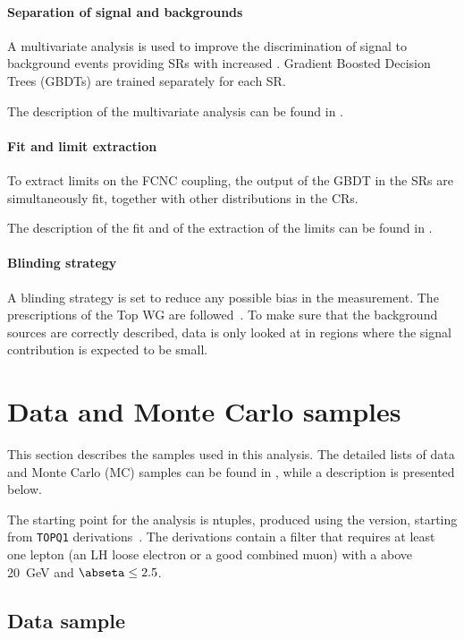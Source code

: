 \paragraph{Separation of signal and backgrounds}
A multivariate analysis is used to improve the discrimination of
signal to background events providing SRs with increased \ssb. 
Gradient Boosted Decision Trees (GBDTs) are trained separately for each SR. 

\noindent The description of the multivariate analysis can be found in
. 

\paragraph{Fit and limit extraction}
To extract limits on the FCNC \tZc coupling, the output of the
GBDT in the SRs are simultaneously fit, together with other 
distributions in the CRs. 

\noindent The description of the fit and of the extraction of the limits can be
found in .

\paragraph{Blinding strategy}
A blinding strategy is set to reduce any possible bias in the measurement. 
The prescriptions of the Top WG are followed~\cite{top:blind}.
To make sure that the background sources are correctly described,
data is only looked at in regions where the signal contribution is expected to be small. 

\section{Data and Monte Carlo samples}
\label{sec:samples}
This section describes the samples used in this analysis.
The detailed lists of data and Monte Carlo (MC) samples can be found
in \App{\ref{sec:app_mc}}, 
while a description is presented below.

The starting point for the analysis is ntuples, produced using the 
\anabasevers version, starting from \texttt{TOPQ1} derivations~\cite{top:deriv}.
The derivations contain a filter that requires at least one lepton
(an LH loose electron or a good combined muon) with a \pT above \SI{20}{\GeV} and $\abseta \leq 2.5$. 

\subsection{Data sample}%
\label{sec:samples:data}

